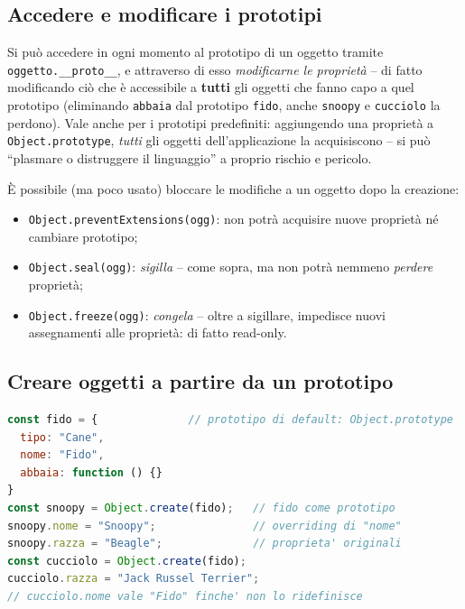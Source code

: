 \subsection{Accedere e modificare i prototipi}
Si pu\`o accedere in ogni momento al prototipo di un oggetto tramite
\texttt{oggetto.\_\_proto\_\_}, e attraverso di esso \emph{modificarne le propriet\`a} --
di fatto modificando ci\`o che \`e accessibile a \textbf{tutti} gli oggetti che fanno capo a
quel prototipo (eliminando \texttt{abbaia} dal prototipo \texttt{fido}, anche
\texttt{snoopy} e \texttt{cucciolo} la perdono). Vale anche per i prototipi predefiniti:
aggiungendo una propriet\`a a \texttt{Object.prototype}, \emph{tutti} gli oggetti
dell'applicazione la acquisiscono -- si pu\`o ``plasmare o distruggere il linguaggio'' a
proprio rischio e pericolo.

\`E possibile (ma poco usato) bloccare le modifiche a un oggetto dopo la creazione:
\begin{itemize}
  \item \texttt{Object.preventExtensions(ogg)}: non potr\`a acquisire nuove propriet\`a n\'e
        cambiare prototipo;
  \item \texttt{Object.seal(ogg)}: \emph{sigilla} -- come sopra, ma non potr\`a nemmeno
        \emph{perdere} propriet\`a;
  \item \texttt{Object.freeze(ogg)}: \emph{congela} -- oltre a sigillare, impedisce nuovi
        assegnamenti alle propriet\`a: di fatto read-only.
\end{itemize}

\subsection{Creare oggetti a partire da un prototipo}
\begin{lstlisting}[language=JavaScript]
const fido = {              // prototipo di default: Object.prototype
  tipo: "Cane",
  nome: "Fido",
  abbaia: function () {}
}
const snoopy = Object.create(fido);   // fido come prototipo
snoopy.nome = "Snoopy";               // overriding di "nome"
snoopy.razza = "Beagle";              // proprieta' originali
const cucciolo = Object.create(fido);
cucciolo.razza = "Jack Russel Terrier";
// cucciolo.nome vale "Fido" finche' non lo ridefinisce
\end{lstlisting}

